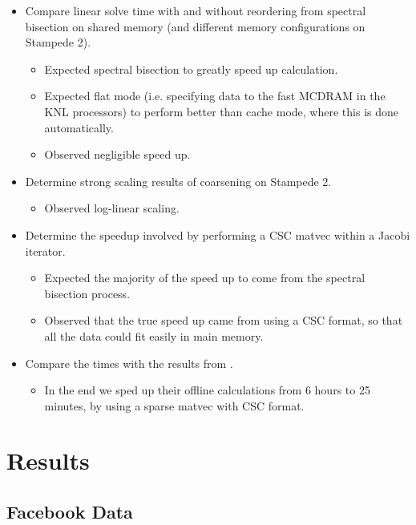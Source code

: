 \documentclass[11pt]{article}
\begin{document}
\begin{itemize}
	\item Compare linear solve time with and without reordering from
spectral bisection on shared memory (and different memory
		configurations on Stampede 2). 
		\begin{itemize}
			\item Expected spectral bisection to greatly speed up
				calculation. 
                        \item Expected flat mode (i.e. specifying data to the
fast MCDRAM in the KNL processors) to perform better than cache mode, where this
is done automatically.
			\item Observed negligible speed up.
		\end{itemize}
	
	\item Determine strong scaling results of coarsening on Stampede 2. 
		\begin{itemize}
			\item Observed log-linear scaling. 
		\end{itemize}
	\item Determine the speedup involved by performing a CSC matvec within a
		Jacobi iterator. 
		\begin{itemize}
			\item Expected the majority of the speed up to come from
				the spectral bisection process. 
			\item Observed that the true speed up came from using a
				CSC format, so that all the data could fit
				easily in main memory. 
		\end{itemize}
	\item Compare the times with the results from \cite{xie}.
		\begin{itemize}
			\item In the end we sped up their offline calculations
				from 6 hours to 25 minutes, by using a sparse
				matvec with CSC format. 
		\end{itemize}
\end{itemize}

\section{Results}
\subsection{Facebook Data}
\end{document}
